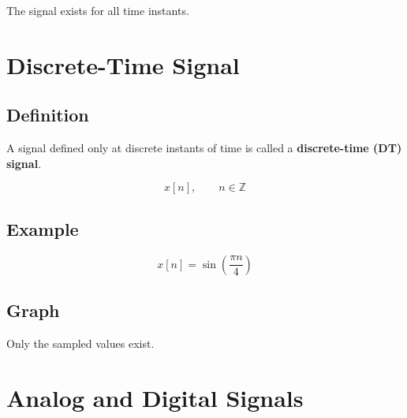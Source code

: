 The signal exists for all time instants.


\section{Discrete-Time Signal}

\subsection{Definition}

A signal defined only at discrete instants of time is called a
\textbf{discrete-time (DT) signal}.

\[
x[n],\qquad n\in\mathbb{Z}
\]


\subsection{Example}

\[
x[n]=\sin\left(\frac{\pi n}{4}\right)
\]


\subsection{Graph}

\begin{center}
\end{center}

Only the sampled values exist.


\section{Analog and Digital Signals}

